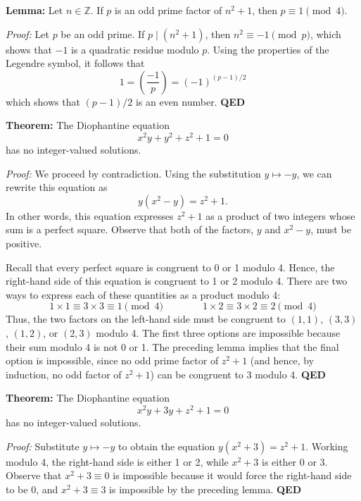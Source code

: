 \documentclass[11pt]{article}
\newcommand{\Z}{{\mathbb{Z}}}
\begin{document}
\textbf{Lemma:} Let $n \in \Z$. If $p$ is an odd prime factor of $n^2 + 1$, then $p \equiv 1 \pmod 4$.

\textit{Proof:} Let $p$ be an odd prime. If $p \mid (n^2 + 1)$, then $n^2 \equiv -1 \pmod p$, which shows that $-1$ is a quadratic residue modulo $p$. Using the properties of the Legendre symbol, it follows that
\[ 1 = \left( \frac{-1}{p} \right) = (-1)^{(p-1)/2} \]
which shows that $(p-1)/2$ is an even number. \textbf{QED}

\textbf{Theorem:} The Diophantine equation
\[ x^2 y + y^2 + z^2 + 1 = 0 \]
has no integer-valued solutions.

\textit{Proof:} We proceed by contradiction. Using the substitution $y \mapsto -y$, we can rewrite this equation as
\[ y(x^2 - y) = z^2 + 1. \]
In other words, this equation expresses $z^2 + 1$ as a product of two integers whose sum is a perfect square. Observe that both of the factors, $y$ and $x^2 - y$, must be positive.

Recall that every perfect square is congruent to 0 or 1 modulo 4. Hence, the right-hand side of this equation is congruent to 1 or 2 modulo 4. There are two ways to express each of these quantities as a product modulo 4:
\[ 1 \times 1 \equiv 3 \times 3 \equiv 1 \pmod 4 \qquad\qquad 1 \times 2 \equiv 3 \times 2 \equiv 2 \pmod 4 \]
Thus, the two factors on the left-hand side must be congruent to $(1, 1)$, $(3, 3)$, $(1, 2)$, or $(2, 3)$ modulo 4. The first three options are impossible because their sum modulo 4 is not 0 or 1. The preceding lemma implies that the final option is impossible, since no odd prime factor of $z^2 + 1$ (and hence, by induction, no odd factor of $z^2 + 1$) can be congruent to 3 modulo 4. \textbf{QED}

\textbf{Theorem:} The Diophantine equation
\[ x^2 y + 3y + z^2 + 1 = 0 \]
has no integer-valued solutions.

\textit{Proof:} Substitute $y \mapsto -y$ to obtain the equation $y(x^2 + 3) = z^2 + 1$. Working modulo 4, the right-hand side is either 1 or 2, while $x^2 + 3$ is either 0 or 3. Observe that $x^2 + 3 \equiv 0$ is impossible because it would force the right-hand side to be 0, and $x^2 + 3 \equiv 3$ is impossible by the preceding lemma. \textbf{QED}
\end{document}
